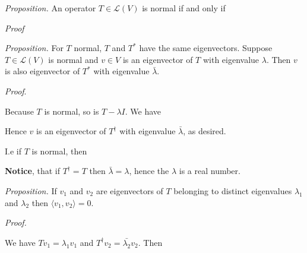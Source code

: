 \documentclass{article}
\begin{document}
\textit{Proposition.} An operator $T \in \mathcal{L}(V)$ is normal if and only if


\textit{Proof}


\skl

\textit{Proposition.} For $T$ normal, $T$ and $T^*$ have the same eigenvectors. Suppose $T \in \mathcal{L}(V)$ is normal and $v \in V$ is an eigenvector of $T$ with eigenvalue $\lambda$. Then $v$ is also eigenvector of $T^*$ with eigenvalue $\bar{\lambda}$.

\textit{Proof}.

Because $T$ is normal, so is $T - \lambda I$. We have


Hence $v$ is an eigenvector of $T^\dag$ with eigenvalue $\bar{\lambda}$, as desired.

I.e if $T$ is normal, then


\textbf{Notice}, that if $T^\dag = T$ then $\bar{\lambda} = \lambda$, hence the $\lambda$ is a real number.


\skl
\textit{Proposition.} If $v_1$ and $v_2$ are eigenvectors of $T$ belonging to distinct eigenvalues $\lambda_1$ and $\lambda_2$ then $\langle v_1, v_2 \rangle =0$.

\textit{Proof.}

We have $Tv_1 = \lambda_1 v_1$ and $T^\dag v_2 = \bar{\lambda_2}v_2$. Then

\end{document}
